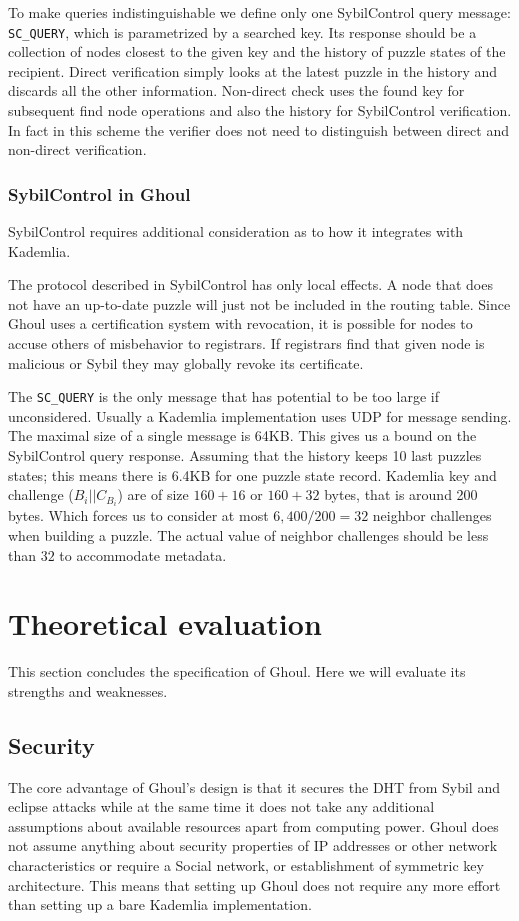   To make queries indistinguishable we define only one SybilControl query
  message: \texttt{SC\_QUERY}, which is parametrized by a searched key. Its
  response should be a collection of nodes closest to the given key and the
  history of puzzle states of the recipient.
  Direct verification simply looks at the latest puzzle in the history and
  discards all the other information.
  Non-direct check uses the found key for subsequent find node operations and
  also the history for SybilControl verification.
  In fact in this scheme the verifier does not need to distinguish between
  direct and non-direct verification.

\subsubsection{SybilControl in Ghoul}
  SybilControl requires additional consideration as to how it integrates with
  Kademlia.

  The protocol described in SybilControl has only local effects.
  A node that does not have an up-to-date puzzle will just not be included in
  the routing table.
  Since Ghoul uses a certification system with revocation, it is possible for
  nodes to accuse others of misbehavior to registrars.
  If registrars find that given node is malicious or Sybil they may globally
  revoke its certificate.

  The \texttt{SC\_QUERY} is the only message that has potential to be too large
  if unconsidered.
  Usually a Kademlia implementation uses UDP for message sending.
  The maximal size of a single message is 64KB.
  This gives us a bound on the SybilControl query response.
  Assuming that the history keeps 10 last puzzles states; this means there is
  6.4KB for one puzzle state record.
  Kademlia key and challenge ($B_i || C_{B_i}$) are of size $160 + 16$ or $160 +
  32$ bytes, that is around 200 bytes.
  Which forces us to consider at most $6,400/200 = 32$ neighbor challenges when
  building a puzzle.
  The actual value of neighbor challenges should be less than $32$ to accommodate
  metadata.
\section{Theoretical evaluation}
\label{sec:ghoul_summary}
  This section concludes the specification of Ghoul. Here we will evaluate its
  strengths and weaknesses.
  
  \subsection{Security}
  The core advantage of Ghoul's design is that it secures the DHT from Sybil and
  eclipse attacks while at the same time it does not take any additional
  assumptions about available resources apart from computing power.
  Ghoul does not assume anything about security properties of IP addresses or
  other network characteristics or require a Social network, or establishment of
  symmetric key architecture.
  This means that setting up Ghoul does not require any more effort than setting
  up a bare Kademlia implementation.

